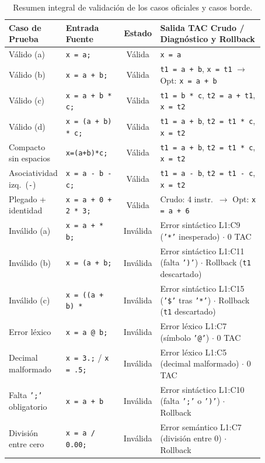 \documentclass[11pt, letterpaper]{article}
\begin{document}
\begin{table}[htbp]
\centering
\caption{Resumen integral de validación de los casos oficiales y casos borde.}
\label{tab:resumen_pruebas}
\footnotesize
\renewcommand{\arraystretch}{1.28}
\begin{tabular}{@{}p{0.22\linewidth}p{0.23\linewidth}cp{0.42\linewidth}@{}}
\toprule
\textbf{Caso de Prueba} & \textbf{Entrada Fuente} & \textbf{Estado} & \textbf{Salida TAC Crudo / Diagnóstico y Rollback} \\
\midrule
Válido (a) & \texttt{x = a;} & Válida & \texttt{x = a} \\
Válido (b) & \texttt{x = a + b;} & Válida & \texttt{t1 = a + b}, \texttt{x = t1} $\rightarrow$ Opt: \texttt{x = a + b} \\
Válido (c) & \texttt{x = a + b * c;} & Válida & \texttt{t1 = b * c}, \texttt{t2 = a + t1}, \texttt{x = t2} \\
Válido (d) & \texttt{x = (a + b) * c;} & Válida & \texttt{t1 = a + b}, \texttt{t2 = t1 * c}, \texttt{x = t2} \\
Compacto sin espacios & \texttt{x=(a+b)*c;} & Válida & \texttt{t1 = a + b}, \texttt{t2 = t1 * c}, \texttt{x = t2} \\
Asociatividad izq.\ (\texttt{-}) & \texttt{x = a - b - c;} & Válida & \texttt{t1 = a - b}, \texttt{t2 = t1 - c}, \texttt{x = t2} \\
Plegado + identidad & \texttt{x = a + 0 + 2 * 3;} & Válida & Crudo: 4 instr.\ $\rightarrow$ Opt: \texttt{x = a + 6} \\
\midrule
Inválido (a) & \texttt{x = a + * b;} & Inválida & Error sintáctico L1:C9 (\texttt{'*'} inesperado) $\cdot$ 0 TAC \\
Inválido (b) & \texttt{x = (a + b;} & Inválida & Error sintáctico L1:C11 (falta \texttt{')'}) $\cdot$ Rollback (\texttt{t1} descartado) \\
Inválido (c) & \texttt{x = ((a + b) *} & Inválida & Error sintáctico L1:C15 (\texttt{'\$'} tras \texttt{'*'}) $\cdot$ Rollback (\texttt{t1} descartado) \\
Error léxico & \texttt{x = a @ b;} & Inválida & Error léxico L1:C7 (símbolo \texttt{'@'}) $\cdot$ 0 TAC \\
Decimal malformado & \texttt{x = 3.;} / \texttt{x = .5;} & Inválida & Error léxico L1:C5 (decimal malformado) $\cdot$ 0 TAC \\
Falta \texttt{';'} obligatorio & \texttt{x = a + b} & Inválida & Error sintáctico L1:C10 (falta \texttt{';'} o \texttt{')'}) $\cdot$ Rollback \\
División entre cero & \texttt{x = a / 0.00;} & Inválida & Error semántico L1:C7 (división entre 0) $\cdot$ Rollback \\
\bottomrule
\end{tabular}
\end{table}
\end{document}
